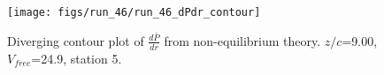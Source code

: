 \begin{figure}[H]
\centering
\texttt{[image: figs/run\_46/run\_46\_dPdr\_contour]}
\caption{Diverging contour plot of $\frac{d\bar{P}}{dr}$ from non-equilibrium theory. $z/c$=9.00, $V_{free}$=24.9, station 5.}
\label{fig:run_46_dPdr_contour}
\end{figure}



